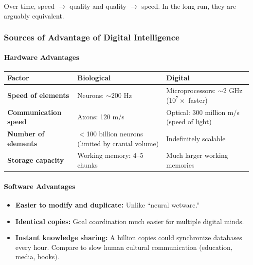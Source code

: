 Over time, speed $\to$ quality and quality $\to$ speed. In the long run, they are arguably equivalent.

\separator

\subsubsection{Sources of Advantage of Digital Intelligence}

\paragraph*{Hardware Advantages}

\begin{center}
\renewcommand{\arraystretch}{1.3}
\begin{tabular}{@{} l p{4cm} p{5.5cm} @{}}
\toprule
\textbf{Factor} & \textbf{Biological} & \textbf{Digital} \\
\midrule
\textbf{Speed of elements} & Neurons: $\sim$200 Hz & Microprocessors: $\sim$2 GHz ($10^7\times$ faster) \\
\textbf{Communication speed} & Axons: 120 m/s & Optical: 300 million m/s (speed of light) \\
\textbf{Number of elements} & $<$100 billion neurons (limited by cranial volume) & Indefinitely scalable \\
\textbf{Storage capacity} & Working memory: 4--5 chunks & Much larger working memories \\
\bottomrule
\end{tabular}
\end{center}

\paragraph*{Software Advantages}

\begin{itemize}
  \item \textbf{Easier to modify and duplicate:} Unlike ``neural wetware.''
  \item \textbf{Identical copies:} Goal coordination much easier for multiple digital minds.
  \item \textbf{Instant knowledge sharing:} A billion copies could synchronize databases every hour. Compare to slow human cultural communication (education, media, books).
\end{itemize}

\separator

